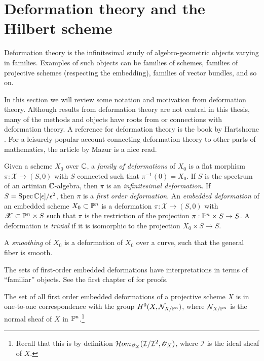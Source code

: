 

\section{Deformation theory and the Hilbert scheme}

Deformation theory is the infinitesimal study of algebro-geometric objects varying in families. Examples of such objects can be families of schemes, families of projective schemes (respecting the embedding), families of vector bundles, and so on.

In this section we will review some notation and motivation from deformation theory. Although results from deformation theory are not central in this thesis, many of the methods and objects have roots from or connections with deformation theory. A reference for deformation theory is the book by Hartshorne \cite{hartshorne_deformations}. For a leisurely popular account connecting deformation theory to other parts of mathematics, the article \cite{mazur_deformations} by Mazur is a nice read.

\begin{definition}
Given a scheme $X_0$ over $\C$, a \emph{family of deformations} of $X_0$ is a flat morphism $\pi:\mathscr X \to (S,0)$ with $S$ connected such that $\pi^{-1}(0)=X_0$. If $S$ is the spectrum of an artinian $\C$-algebra, then $\pi$ is an \emph{infinitesimal deformation}. If $S=\Spec \C[\epsilon]/\epsilon^2$, then  $\pi$ is a \emph{first order deformation}. An \emph{embedded deformation} of an embedded scheme $X_0 \subset \P^n$ is a deformation $\pi:\mathscr X \to (S,0)$ with $\mathscr X \subset \P^n \times S$ such that $\pi$ is the restriction of the projection $\pi:\P^n \times S \to S$. A deformation is \emph{trivial} if it is isomorphic to the projection $X_0 \times S \to S$.  

A \emph{smoothing} of $X_0$ is a deformation of $X_0$ over a curve, such that the general fiber is smooth.
\end{definition}

The sets of first-order embedded deformations have interpretations in terms of ``familiar'' objects. See the first chapter of \cite{hartshorne_deformations} for proofs.

\begin{proposition}
The set of all first order embedded deformations of a projective scheme $X$ is in one-to-one correspondence with the group $H^0(X,\mathcal N_{X/\P^n})$, where $\mathcal N_{X/\P^n}$ is the normal sheaf of $X$ in $\P^n$.\footnote{Recall that this is by definition $\mathcal Hom_{\OO_X}(\mathcal I/\mathcal I^2, \OO_X)$, where $\mathcal I$ is the ideal sheaf of $X$.}
\end{proposition}

